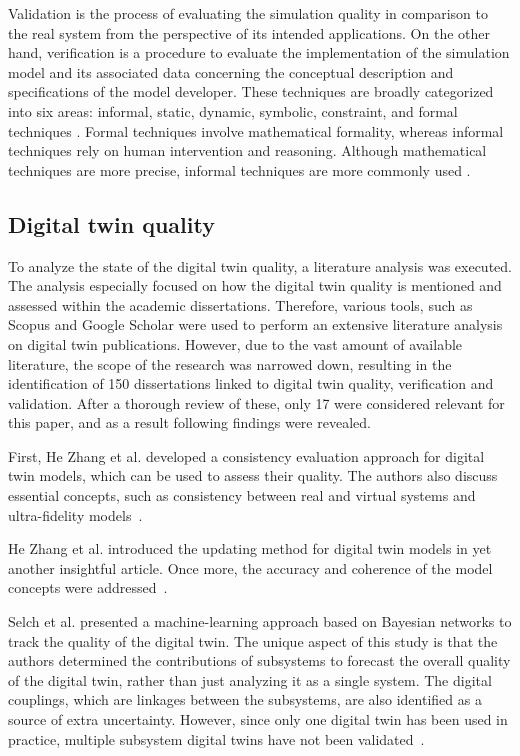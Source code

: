 \documentclass{llncs}
\begin{document}
    Validation is the process of evaluating the simulation quality in comparison to the real system from the perspective of its intended applications. 
    On the other hand, verification is a procedure to evaluate the implementation of the simulation model and 
    its associated data concerning the conceptual description and specifications of the model developer\cite{StewartSimulation}\cite{VerificationValidationSergent}. 
    These techniques are broadly categorized into six areas: informal, static, dynamic, 
    symbolic, constraint, and formal techniques \cite{balcicategories}\cite{balcitechniques}. Formal techniques involve mathematical formality, whereas informal techniques rely on 
    human intervention and reasoning. Although mathematical techniques are more precise, informal techniques are more commonly used \cite{balcicategories}. 

    \subsection{Digital twin quality}
    To analyze the state of the digital twin quality, a literature analysis was executed. 
    The analysis especially focused on how the digital twin quality is mentioned and assessed within the academic dissertations. Therefore, various tools, such as Scopus and Google Scholar were 
    used to perform an extensive literature analysis on digital twin publications. However, due to the vast amount of available literature, the scope of the research was narrowed down, resulting in the identification of 
    150 dissertations linked to digital twin quality, verification and validation. After a thorough review of these, only 17 were considered relevant for this paper, and as a result following findings were revealed.
  
    
    First, He Zhang et al. developed a consistency evaluation approach for digital twin models, which can be used to assess their quality. 
    The authors also discuss essential concepts, such as consistency between real and virtual systems and ultra-fidelity models~\cite{ZHANGEVALUATIONMETHOD}. 

    He Zhang et al. introduced the updating method for digital twin models in yet another insightful article.
    Once more, the accuracy and coherence of the model concepts were addressed~\cite{ZHANGUPDATEMETHOD}.

    Selch et al. presented a machine-learning approach based on Bayesian networks to track the quality of the digital twin. 
    The unique aspect of this study is that the authors determined the contributions of subsystems to forecast the overall quality of the digital twin, 
    rather than just analyzing it as a single system. The digital couplings, which are linkages between the subsystems, are also identified as a source of extra uncertainty. 
    However, since only one digital twin has been used in practice, multiple subsystem digital twins have not been validated~\cite{QualityMonitoringofCoupledDigitalTwins}.
\end{document}
